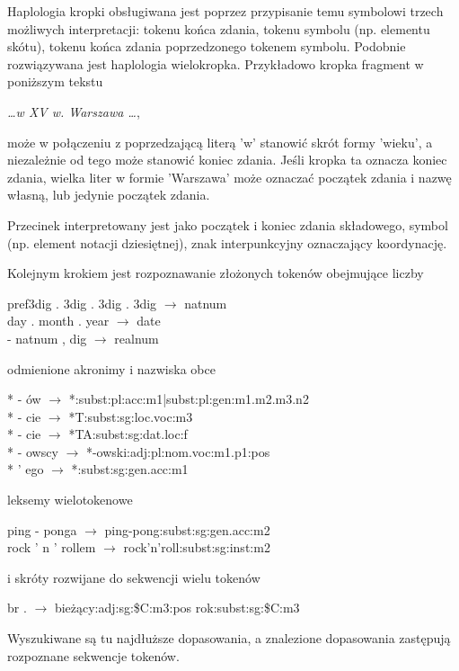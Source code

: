 \documentclass[oneside,pwrcover,withmarginpar,hidelinks,11pt]{article}
\begin{document}
Haplologia kropki obsługiwana jest poprzez przypisanie temu symbolowi trzech 
możliwych interpretacji: tokenu końca zdania, tokenu symbolu (np. elementu skótu), tokenu końca zdania poprzedzonego tokenem symbolu.
Podobnie rozwiązywana jest haplologia wielokropka.
Przykładowo kropka fragment w poniższym tekstu 
\begin{center}
{\it \dots w XV w. Warszawa \dots}, 
\end{center}
może w połączeniu z poprzedzającą literą 'w' stanowić skrót formy 'wieku', a niezależnie od tego może stanowić koniec zdania. 
Jeśli kropka ta oznacza koniec zdania, wielka liter w formie 'Warszawa' może oznaczać początek zdania i nazwę własną,
lub jedynie początek zdania.

Przecinek interpretowany jest jako początek i koniec zdania składowego, symbol (np. element notacji dziesiętnej), 
znak interpunkcyjny oznaczający koordynację.

Kolejnym krokiem jest rozpoznawanie złożonych tokenów
obejmujące liczby %
\begin{center}
pref3dig . 3dig . 3dig . 3dig $\to$ natnum\\
day . month . year $\to$ date\\
- natnum , dig $\to$ realnum
\end{center}
odmienione akronimy i nazwiska obce %
\begin{center}
* - ów $\to$ *:subst:pl:acc:m1|subst:pl:gen:m1.m2.m3.n2\\
* - cie $\to$ *T:subst:sg:loc.voc:m3\\
* - cie $\to$ *TA:subst:sg:dat.loc:f\\
* - owscy $\to$ *-owski:adj:pl:nom.voc:m1.p1:pos\\
* ’ ego $\to$ *:subst:sg:gen.acc:m1
\end{center}
leksemy wielotokenowe %
\begin{center}
ping - ponga $\to$ ping-pong:subst:sg:gen.acc:m2\\
rock ’ n ’ rollem $\to$ rock’n’roll:subst:sg:inst:m2
\end{center}
i skróty rozwijane do sekwencji wielu tokenów
\begin{center}
br . $\to$ bieżący:adj:sg:\$C:m3:pos rok:subst:sg:\$C:m3\\
\end{center}
Wyszukiwane są tu najdłuższe dopasowania, a 
znalezione dopasowania zastępują rozpoznane sekwencje tokenów.
\end{document}
